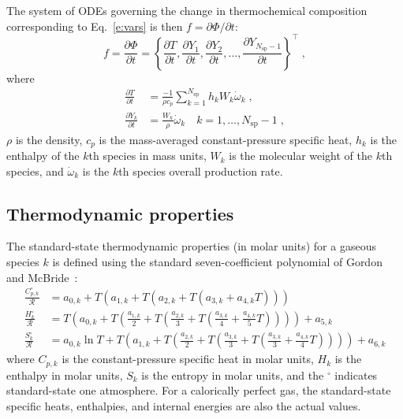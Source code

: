\documentclass[preprint,12pt]{elsarticle}
\newcommand{ \ddt } [1] { \frac{ \partial #1 }{ \partial t } }
\newcommand{ \numsp }{N_{\text{sp}}}
\begin{document}
The system of ODEs governing the change in thermochemical composition corresponding to Eq.~\eqref{e:vars} is then $ f = \partial \Phi/ \partial t$:
\begin{equation}
f = \ddt{\Phi} = \left \lbrace \ddt{T}, \ddt{Y_1}, \ddt{Y_2}, \dotsc, \ddt{Y_{\numsp - 1}} \right\rbrace^{\intercal} \;,
\label{e:ode}
\end{equation}
where
\begin{align}
\ddt{T} &= \frac{-1}{\rho c_p} \sum_{k=1}^{\numsp} h_k W_k \dot{\omega}_k \;, \\
\ddt{Y_k} &= \frac{W_k}{\rho} \dot{\omega}_k \quad k = 1, \dotsc, \numsp - 1 \;, \label{e:dTdt}
\end{align}
$\rho$ is the density, $c_p$ is the mass-averaged constant-pressure specific heat, $h_k$ is the enthalpy of the $k$th species in mass units, $W_k$ is the molecular weight of the $k$th species, and $\dot{\omega}_k$ is the $k$th species overall production rate.

\subsection{Thermodynamic properties}

The standard-state thermodynamic properties (in molar units) for a gaseous species $k$ is defined using the standard seven-coefficient polynomial of Gordon and McBride~\cite{Gordon:1976wp}:
\begin{align}
\frac{C_{p,k}^{\circ}}{\mathcal{R}} &= a_{0,k} + T \left( a_{1,k} + T \left( a_{2,k} + T \left( a_{3,k} + a_{4,k} T \right) \right) \right) \label{e:cpk} \\
\frac{H_k^{\circ}}{\mathcal{R}} &= T \left( a_{0,k} + T \left( \frac{a_{1,k}}{2} + T \left( \frac{a_{2,k}}{3} + T \left( \frac{a_{3,k}}{4} + \frac{a_{4,k}}{5} T \right) \right) \right) \right) + a_{5,k} \label{e:hk} \\
\frac{S_k^{\circ}}{\mathcal{R}} &= a_{0,k} \ln T + T \left( a_{1,k} + T \left( \frac{a_{2,k}}{2} + T \left( \frac{a_{3,k}}{3} + T \left( \frac{a_{3,k}}{3} + \frac{a_{4,k}}{4} T \right) \right) \right) \right) + a_{6,k} \label{e:sk}
\end{align}
where $C_{p,k}$ is the constant-pressure specific heat in molar units, $H_k$ is the enthalpy in molar units, $S_k$ is the entropy in molar units, and the ${}^{\circ}$ indicates standard-state one atmosphere.
For a calorically perfect gas, the standard-state specific heats, enthalpies, and internal energies are also the actual values.
\end{document}
